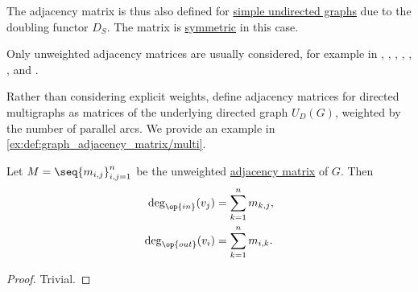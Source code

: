 \begin{comments}
  \item The adjacency matrix is thus also defined for \hyperref[def:undirected_graph]{simple undirected graphs} due to the doubling functor \hyperref[def:graph_functors/simple_doubling]{\( D_S \)}. The matrix is \hyperref[def:transpose_matrix]{symmetric} in this case.

  \item Only unweighted adjacency matrices are usually considered, for example in
  \textcite[28]{Diestel2017GraphTheory},
  \cite[151]{Harary1969GraphTheory},
  \cite[54]{Bollobás1998ModernGraphTheory},
  \cite[195]{Erickson2019Algorithms},
  \cite[32]{Зыков2004ТеорияГрафов},
  \cite[27]{ЕмеличевИПр1990ТеорияГрафов},
  \cite[\S 7.4.2]{Новиков2013ДискретнаяМатематика} and
  \cite[52]{Мирчев2001Графи}.

  \item Rather than considering explicit weights, \textcite[def. 2.1.1]{Knauer2019AlgebraicGraphTheory} define adjacency matrices for directed multigraphs as matrices of the underlying directed graph \hyperref[def:graph_functors/directed_forgetful]{\( U_D(G) \)}, weighted by the number of parallel arcs. We provide an example in \cref{ex:def:graph_adjacency_matrix/multi}.
\end{comments}

\begin{proposition}\label{thm:adjacency_matrix_degree}
  Let \( M = \seq{ m_{i,j} }_{i,j=1}^n \) be the unweighted \hyperref[def:graph_adjacency_matrix]{adjacency matrix} of \( G \). Then
  \begin{align*}
    \deg_{\op{in}}(v_j)  &= \sum_{k=1}^n m_{k,j}, \\
    \deg_{\op{out}}(v_i) &= \sum_{k=1}^n m_{i,k}.
  \end{align*}
\end{proposition}
\begin{proof}
  Trivial.
\end{proof}

